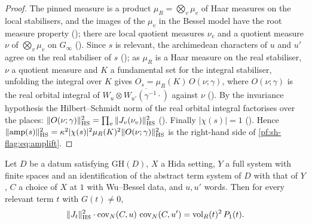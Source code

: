 \begin{proof}
The pinned measure is a product $\mu_R=\bigotimes_v\mu_v$ of Haar measures on the local stabilisers, and the images of the $\mu_v$ in the
Bessel model have the root measure property (); there are local
quotient measures $\nu_v$ and a quotient measure $\nu$ of $\bigotimes_v\mu_v$ on $G_\infty$
(). Since $s$ is relevant, the archimedean characters of $u$ and
$u'$ agree on the real stabiliser of $s$ (); as $\mu_R$ is a Haar measure on the real
stabiliser, $\nu$ a quotient measure and $K$ a fundamental set for the integral stabiliser, unfolding the integral over $K$ gives
$O_s=\mu_R(K)\,O(\nu;\gamma)$, where $O(\nu;\gamma)$ is the real orbital integral of $W_u\otimes\overline{W_{u'}(\gamma^{-1}\cdot)}$ against $\nu$
(). By the invariance hypothesis the Hilbert--Schmidt norm of the real orbital integral
factorises over the places: $\|O(\nu;\gamma)\|_{\mathrm{HS}}^2=\prod_v\|J_v(\nu_v)\|_{\mathrm{HS}}^2$
(). Finally $|\chi(s)|=1$
(). Hence
$\|\mathrm{amp}(s)\|_{\mathrm{HS}}^2=\kappa^2|\chi(s)|^2\mu_R(K)^2\|O(\nu;\gamma)\|_{\mathrm{HS}}^2$ is the right-hand side of
\eqref{pf:sh-flag:eq:amplift}.
\end{proof}

\begin{theorem}\label{pf:sh-flag:jfact}
Let $D$ be a datum satisfying $\mathrm{GH}(D)$, $X$ a Hida setting, $Y$ a full system with finite spaces and an
identification of the abstract term system of $D$ with that of $Y$, $C$ a choice of $X$ at $1$ with Wu--Bessel data, and
$u,u'$ words. Then for every relevant term $t$ with $G(t)\ne0$,
\[
\|J_t\|_{\mathrm{HS}}^2\cdot\operatorname{cov}_N(C,u)\,\operatorname{cov}_N(C,u')=\operatorname{vol}_R(t)^2\,P_1(t).
\]
\end{theorem}

